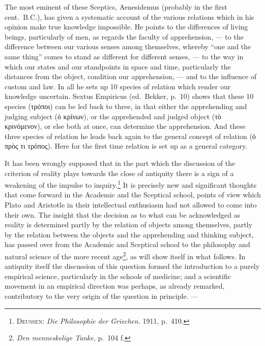 \documentclass[12pt]{article}
\newcommand{\opage}[1]{\marginnote{\footnotesize\textit{[#1]}}}
\begin{document}
The most eminent of these Sceptics, Aenesidemus (probably in the first
cent.\ B.C.), has given a systematic account of the various relations which
in his opinion make true knowledge impossible. He points to the differences
of living beings, particularly of men, as regards the faculty of
apprehension, --- to the difference between our various senses among
themselves, whereby ``one and the same thing'' \opage{9}comes to stand as different
for different senses, --- to the way in which our states and our standpoints
in space and time, particularly the distances from the object, condition our
apprehension, --- and to the influence of custom and law. In all he sets up
10 species of relation which render our knowledge uncertain. Sextus
Empiricus (ed.\ Bekker, p.~10) shows that these 10 species (τρόποι) can be
led back to three, in that either the apprehending and judging subject (ὁ
κρίνων), or the apprehended and judged object (τὸ κρινόμενον), or else both
at once, can determine the apprehension. And these three species of relation
he leads back again to the general concept of relation (ὁ πρὸς τι τρόπος).
Here for the first time relation is set up as a general category.

It has been wrongly supposed that in the part which the discussion of the
criterion of reality plays towards the close of antiquity there is a sign of
a weakening of the impulse to inquiry.\footnote{\textsc{Deussen}:
\textit{Die Philosophie der Griechen}. 1911, p.~410.} It is precisely new
and significant thoughts that come forward in the Academic and the Sceptical
school, points of view which Plato and Aristotle in their intellectual
enthusiasm had not allowed to come into their own. The insight that the
decision as to what can be acknowledged as reality is determined partly by
the relation of objects among themselves, partly by the relation between the
objects and the apprehending and thinking subject, has passed over from the
Academic and Sceptical school to the philosophy and natural science of the
more recent age\footnote{\textit{Den menneskelige Tanke}, p.~104 f.}, as
will show itself in what follows. In antiquity itself the discussion of this
question formed the introduction to a purely empirical science, particularly
in the schools of medicine; and a scientific movement in an empirical
direction was perhaps, as already \opage{10}remarked, contributory to the very origin
of the question in principle. ---
\end{document}

